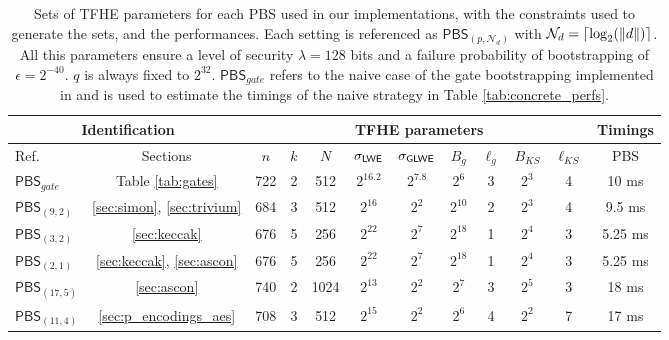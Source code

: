 \newcommand{\PBS}{\mathsf{PBS}}

\begin{table}
    \centering
    \small %
    \begin{tabular}{|l|c||c|c|c|c|c|c|c|c|c||c|}
            \hline
        \multicolumn{2}{|c||}{\textbf{Identification}} & \multicolumn{9}{c||}{\textbf{TFHE parameters}} & \textbf{Timings} \\
        \hline
        Ref. & Sections & $n$ & $k$ & $N$ & $\sigma_{\texttt{\textsf{LWE}}}$ & $\sigma_{\texttt{\textsf{GLWE}}}$ & $B_g$ & $\ell_g$ & $B_{KS}$ & $\ell_{KS}$ & PBS\\
        \hline
        \hline
            \texttt{$\PBS_{gate}$} & Table \ref{tab:gates} & 722 & 2 & 512 & $2^{16.2}$ & $2^{7.8}$ & $2^6$ & 3 & $2^3$ & 4 & 10 ms\\
           \hline
          \hline
        \texttt{$\PBS_{(9, 2)}$} & \ref{sec:simon}, \ref{sec:trivium} & 684 & 3 & 512 & $2^{16}$ & $2^{2}$& $2^{10}$ & 2 & $2^3$ & 4 & 9.5 ms\\
           \hline
       
        \texttt{$\PBS_{(3, 2)}$} & \ref{sec:keccak} & 676 & 5 & 256 & $2^{22}$ & $2^{7}$& $2^{18}$ & 1 & $2^4$ & 3 & 5.25 ms \\
          \hline
    
        \texttt{$\PBS_{(2, 1)}$} & \ref{sec:keccak}, \ref{sec:ascon} & 676 & 5 & 256 & $2^{22}$ & $2^{7}$& $2^{18}$ & 1 & $2^4$ & 3 & 5.25 ms \\
         \hline
        
        \texttt{$\PBS_{(17, 5)}$} & \ref{sec:ascon} & 740 & 2 & 1024 & $2^{13}$ & $2^{2}$& $2^7$ & 3 & $2^5$ & 3 & 18 ms\\
         \hline
        
        \texttt{$\PBS_{(11, 4)}$} & \ref{sec:p_encodings_aes} & 708 & 3 & 512 & $2^{15}$ & $2^{2}$& $2^6$ & 4 & $2^2$ & 7 & 17 ms  \\
            \hline
       \end{tabular}

    \medskip 
    
    \caption{Sets of TFHE parameters for each PBS used in our implementations, with the constraints used to generate the sets, and the performances. Each setting is referenced as \texttt{$\PBS_{(p, \mathcal{N}_d)}$} with $\mathcal{N}_d = \lceil \log_2(\lVert d \rVert)\rceil$. All this parameters ensure a level of security $\lambda=128$ bits and a failure probability of bootstrapping of $\epsilon=2^{-40}$. $q$ is always fixed to $2^{32}$. \texttt{$\PBS_{gate}$} refers to the naive case of the gate bootstrapping implemented in \cite{tfhe-rs} and is used to estimate the timings of the naive strategy in Table \ref{tab:concrete_perfs}.}
    \label{tab:parameters}
\end{table}



